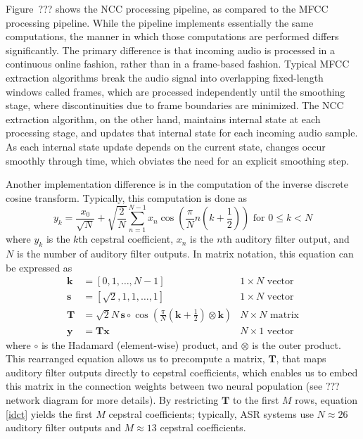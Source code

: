 Figure~??? shows the NCC processing pipeline,
as compared to the MFCC processing pipeline.
While the pipeline implements
essentially the same computations,
the manner in which those computations
are performed differs significantly.
The primary difference is that
incoming audio is processed
in a continuous online fashion,
rather than in a frame-based fashion.
Typical MFCC extraction algorithms
break the audio signal into
overlapping fixed-length windows
called frames,
which are processed independently
until the smoothing stage,
where discontinuities
due to frame boundaries are
minimized.
The NCC extraction algorithm,
on the other hand,
maintains internal state
at each processing stage,
and updates that internal state
for each incoming audio sample.
As each internal state update
depends on the current state,
changes occur smoothly through time,
which obviates the need for
an explicit smoothing step.

Another implementation difference
is in the computation of
the inverse discrete cosine transform.
Typically, this computation is done as
\begin{equation}
  y_k = \frac{x_0}{\sqrt{N}} + \sqrt{\frac{2}{N}} \sum_{n=1}^{N-1}
  x_n \cos \left( \frac{\pi}{N} n \left( k + \frac{1}{2} \right) \right)
  \text{ for } 0 \le k < N
\end{equation}
where $y_k$ is the $k$th cepstral coefficient,
$x_n$ is the $n$th auditory filter output,
and $N$ is the number of auditory filter outputs.
In matrix notation,
this equation can be expressed as
\begin{align}
  \label{idct}
  \mathbf{k} &= \left[ 0, 1, \ldots, N-1 \right] & 1 \times N \text{ vector} \nonumber \\
  \mathbf{s} &= \left[ \sqrt{2}, 1, 1, \ldots, 1 \right] & 1 \times N \text{ vector} \nonumber \\
  \mathbf{T} &= \sqrt{2}{N} \, \mathbf{s} \circ \cos \left( \frac{\pi}{N} \left(
    \mathbf{k} + \frac{1}{2} \right) \otimes \mathbf{k} \right)
    & N \times N \text{ matrix} \nonumber \\
  \mathbf{y} &= \mathbf{T}\mathbf{x} & N \times 1 \text{ vector}
\end{align}
where $\circ$ is the Hadamard (element-wise) product,
and $\otimes$ is the outer product.
This rearranged equation
allows us to precompute a matrix, $\mathbf{T}$,
that maps auditory filter outputs
directly to cepstral coefficients,
which enables us to embed this matrix
in the connection weights between
two neural population
(see ??? network diagram for more details).
By restricting $\mathbf{T}$
to the first $M$ rows,
equation \eqref{idct} yields the first
$M$ cepstral coefficients;
typically, ASR systems
use $N \approx 26$ auditory filter outputs
and $M \approx 13$ cepstral coefficients.

